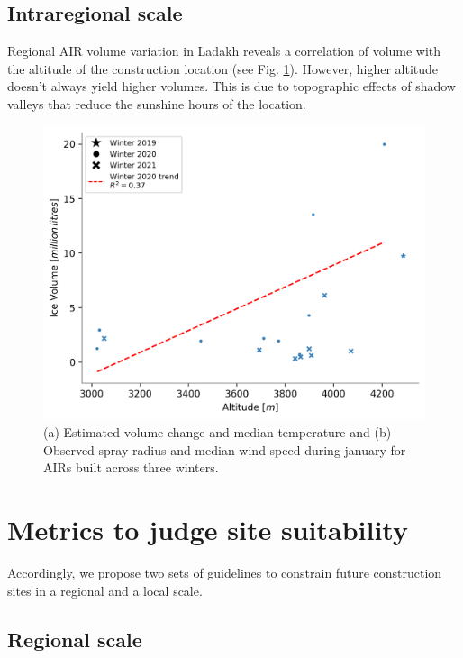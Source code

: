 \subsection{Intraregional scale}

Regional AIR volume variation in Ladakh reveals a correlation of volume with the altitude of the construction
location (see Fig. \ref{fig:altvsvol}). However, higher altitude doesn't always yield higher volumes. This is
due to topographic effects of shadow valleys that reduce the sunshine hours of the location.

\begin{figure}[htb]
\centering
\includegraphics[width=12cm]{figs/altitudevsvolume.png}
\caption{(a) Estimated volume change and median temperature and (b) Observed spray radius and median wind speed
during january for AIRs built across three winters. }
\label{fig:altvsvol}
\end{figure}

\section{Metrics to judge site suitability}

Accordingly, we propose two sets of guidelines to constrain future construction sites in a regional and a local
scale. 

\subsection{Regional scale}


